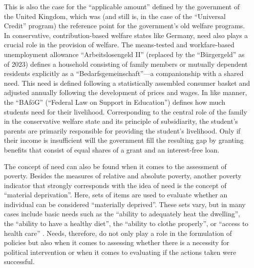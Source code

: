 \documentclass[12pt]{scrartcl}
\begin{document}
This is also the case for the ``applicable amount'' defined by the government of the United Kingdom, which was (and still is, in the case of the ``Universal Credit'' program) the reference point for the government's old welfare programs.
In conservative, contribution-based welfare states like Germany, need also plays a crucial role in the provision of welfare.
The means-tested and workfare-based unemployment allowance ``Arbeitslosengeld II'' (replaced by the ``B{\"u}rgergeld'' as of 2023) defines a household consisting of family members or mutually dependent residents explicitly as a ``Bedarfs\-gemeinschaft''---a companionship with a shared need.
This need is defined following a statistically assembled consumer basket and adjusted annually following the development of prices and wages.
In like manner, the ``BAf{\"o}G'' (``Federal Law on Support in Education'') defines how much students need for their livelihood.
Corresponding to the central role of the family in the conservative welfare state and its principle of subsidiarity, the student's parents are primarily responsible for providing the student's livelihood.
Only if their income is insufficient will the government fill the resulting gap by granting benefits that consist of equal shares of a grant and an interest-free loan.

The concept of need can also be found when it comes to the assessment of poverty.
Besides the measures of relative and absolute poverty, another poverty indicator that strongly corresponds with the idea of need is the concept of ``material deprivation''.
Here, sets of items are used to evaluate whether an individual can be considered ``materially deprived''.
These sets vary, but in many cases include basic needs such as the ``ability to adequately heat the dwelling'', the ``ability to have a healthy diet'', the ``ability to clothe properly'', or ``access to health care'' \citep[p.~37]{boarini_measures_2006}.
Needs, therefore, do not only play a role in the formulation of policies but also when it comes to assessing whether there is a necessity for political intervention or when it comes to evaluating if the actions taken were successful.
\end{document}
